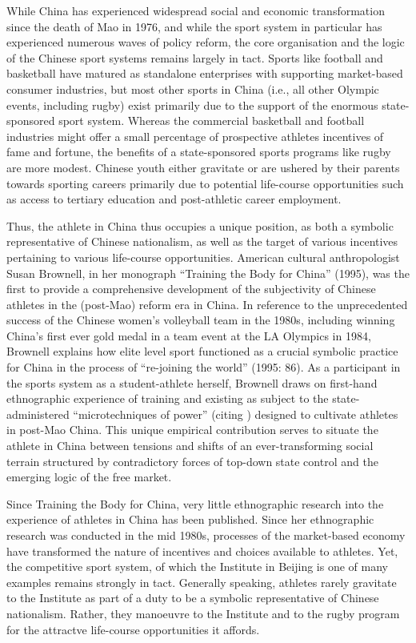 \begin{CJK}{UTF8}{gbsn}
While China has experienced widespread social and economic transformation since the death of Mao in 1976, and while the sport system in particular has experienced numerous waves of policy reform,  the core organisation and the logic of the Chinese sport systems remains largely in tact.  Sports like football and basketball have matured as standalone enterprises with supporting market-based consumer industries, but most other sports in China (i.e., all other Olympic events, including rugby) exist primarily due to the support of the enormous state-sponsored sport system.  Whereas the commercial basketball and football industries might offer a small percentage of prospective athletes incentives of fame and fortune, the benefits of a state-sponsored sports programs like rugby are more modest.  Chinese youth either gravitate or are ushered by their parents towards sporting careers primarily due to potential life-course opportunities such as access to tertiary education and post-athletic career employment.

Thus, the athlete in China thus occupies a unique position, as both a symbolic representative of Chinese nationalism, as well as the target of various incentives pertaining to various life-course opportunities. American cultural anthropologist Susan Brownell, in her monograph ``Training the Body for China'' (1995), was the first to provide a comprehensive development of the subjectivity of Chinese athletes in the (post-Mao) reform era in China.  In reference to the unprecedented success of the Chinese women’s volleyball team in the 1980s, including winning China's first ever gold medal in a team event at the LA Olympics in 1984, Brownell explains how elite level sport functioned as a crucial symbolic practice for China in the process of ``re-joining the world'' (1995: 86).  As a participant in the sports system as a student-athlete herself, Brownell draws on first-hand ethnographic experience of training and existing as subject to the state-administered ``microtechniques of power'' (citing \cite{Foucault1977}) designed to cultivate athletes in post-Mao China. This unique empirical contribution serves to situate the athlete in China between tensions and shifts of an ever-transforming social terrain structured by contradictory forces of top-down state control and the emerging logic of the free market.

Since Training the Body for China, very little ethnographic research into the experience of athletes in China has been published. Since her ethnographic research was conducted in the mid 1980s, processes of the market-based economy have transformed the nature of incentives and choices available to athletes.  Yet, the competitive sport system, of which the Institute in Beijing is one of many examples remains strongly in tact.  Generally speaking, athletes rarely gravitate to the Institute as part of a duty to be a symbolic representative of Chinese nationalism.  Rather, they manoeuvre to the Institute and to the rugby program for the attractve life-course opportunities it affords.


\end{CJK}
